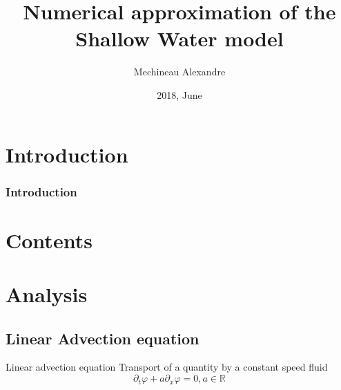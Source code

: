 \documentclass{beamer}
\begin{document}
    \title{ Numerical approximation of the Shallow Water model}

    \subtitle{}


    \author{Mechineau Alexandre}



    \date{2018, June}

    \begin{frame}
        \titlepage
    \end{frame}

    \section*{Introduction}

    \begin{frame}
        \frametitle{Introduction}
    \end{frame}
    
    
    \section*{Contents}
        \begin{frame}
                \tableofcontents
        \end{frame}
    
    \section{Analysis}
        \subsection{Linear Advection equation}
            \begin{frame}{Linear advection equation}
                Transport of a quantity by a constant speed fluid
                \begin{equation*}
                    \partial_t\varphi+ a\partial_x\varphi = 0, a \in \mathds{R}
                \end{equation*}
            \end{frame}
\end{document}
